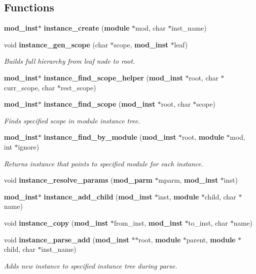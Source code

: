 \subsection*{Functions}
\begin{CompactItemize}
\item 
{\bf mod\_\-inst}$\ast$ {\bf instance\_\-create} ({\bf module} $\ast$mod, char $\ast$inst\_\-name)
\item 
void {\bf instance\_\-gen\_\-scope} (char $\ast$scope, {\bf mod\_\-inst} $\ast$leaf)
\begin{CompactList}\small\item\em Builds full hierarchy from leaf node to root.\item\end{CompactList}\item 
{\bf mod\_\-inst}$\ast$ {\bf instance\_\-find\_\-scope\_\-helper} ({\bf mod\_\-inst} $\ast$root, char $\ast$curr\_\-scope, char $\ast$rest\_\-scope)
\item 
{\bf mod\_\-inst}$\ast$ {\bf instance\_\-find\_\-scope} ({\bf mod\_\-inst} $\ast$root, char $\ast$scope)
\begin{CompactList}\small\item\em Finds specified scope in module instance tree.\item\end{CompactList}\item 
{\bf mod\_\-inst}$\ast$ {\bf instance\_\-find\_\-by\_\-module} ({\bf mod\_\-inst} $\ast$root, {\bf module} $\ast$mod, int $\ast$ignore)
\begin{CompactList}\small\item\em Returns instance that points to specified module for each instance.\item\end{CompactList}\item 
void {\bf instance\_\-resolve\_\-params} ({\bf mod\_\-parm} $\ast$mparm, {\bf mod\_\-inst} $\ast$inst)
\item 
{\bf mod\_\-inst}$\ast$ {\bf instance\_\-add\_\-child} ({\bf mod\_\-inst} $\ast$inst, {\bf module} $\ast$child, char $\ast$name)
\item 
void {\bf instance\_\-copy} ({\bf mod\_\-inst} $\ast$from\_\-inst, {\bf mod\_\-inst} $\ast$to\_\-inst, char $\ast$name)
\item 
void {\bf instance\_\-parse\_\-add} ({\bf mod\_\-inst} $\ast$$\ast$root, {\bf module} $\ast$parent, {\bf module} $\ast$child, char $\ast$inst\_\-name)
\begin{CompactList}\small\item\em Adds new instance to specified instance tree during parse.\item\end{CompactList}\item 
$$
\end{CompactItemize}

